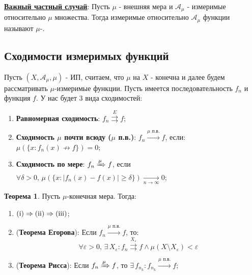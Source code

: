 \documentclass[12pt]{article}
\newcommand{\RN}[1]{%
	\textup{\uppercase\expandafter{\romannumeral#1}}%
}
\newcommand{\MA}{\mathcal{A}}
\newcommand{\VE}{\varepsilon}
\theoremstyle{definition}
\newtheorem{theorem}{Теорема}
\newcommand{\uconv}[1]{\overset{#1}{\rightrightarrows}}
\begin{document}
\uline{\textbf{Важный частный случай}}: Пусть $\mu$ - внешняя мера и $\MA_\mu$ - измеримые относительно $\mu$ множества. Тогда измеримые относительно $\MA_\mu$ функции называют $\mu$-.

\subsection*{Сходимости измеримых функций}
Пусть $(X,\MA_\mu, \mu)$ - ИП, считаем, что $\mu$ на $X$ - конечна и далее будем рассматривать $\mu$-измеримые функции. Пусть имеется последовательность $f_n$ и функция $f$. У нас будет $3$ вида сходимостей:
\begin{enumerate}[label = (\Roman*)]
	\item \textbf{Равномерная сходимость}: $f_n \uconv{E} f$;
	\item \textbf{Сходимость $\mu$ почти всюду ($\mu$ п.в.)}: $f_n \xrightarrow{\mu \text{ п.в.}} f$, если: $\mu\left(\{x \colon f_n(x) \nrightarrow f\}\right) = 0$;
	\item \textbf{Сходимость по мере}: $f_n \xRightarrow{\mu} f$, если $\forall \delta > 0, \, \mu\left(\{x \colon |f_n(x) - f(x)| \geq \delta\}\right) \xrightarrow[n\to\infty]{} 0$;
\end{enumerate}

\begin{theorem}
	Пусть $\mu$-конечная мера. Тогда:
	\begin{enumerate}[label=\arabic*)]
		\item $(\RN{1}) \Rightarrow (\RN{2}) \Rightarrow (\RN{3})$;
		\item (\textbf{Теорема Егорова}): Если $f_n \xrightarrow{\mu \text{ п.в.}} f$, то:
		$$
			\forall \VE > 0,\, \exists \, X_\VE \colon f_n \uconv{X_\VE} f \wedge \mu(X \setminus X_\VE) < \VE
		$$
		\item (\textbf{Теорема Рисса}): Если $f_n \xRightarrow{\mu} f$, то $\exists \, f_{n_k} \colon f_{n_k} \xrightarrow{\mu \text{ п.в.}} f$;
	\end{enumerate}
\end{theorem}
\end{document}
